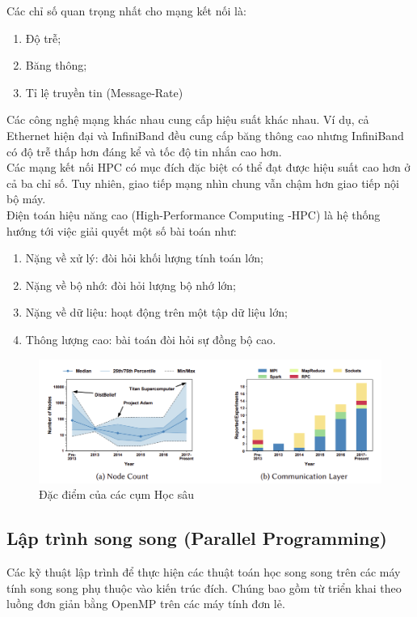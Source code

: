 \documentclass[11pt,a4paper]{article}
\numberwithin{equation}{subsection}
\numberwithin{figure}{subsection}
\numberwithin{table}{subsection}
\begin{document}
Các chỉ số quan trọng nhất cho mạng kết nối là:
\begin{enumerate}[-]
		\item Độ trễ;
		\item Băng thông;
		\item Tỉ lệ truyền tin (Message-Rate)
\end{enumerate}
Các công nghệ mạng khác nhau cung cấp hiệu suất khác nhau. Ví dụ, cả Ethernet hiện đại và InfiniBand đều cung cấp băng thông cao nhưng InfiniBand có độ trễ thấp hơn đáng kể và tốc độ tin nhắn cao hơn.\\
Các mạng kết nối HPC có mục đích đặc biệt có thể đạt được hiệu suất cao hơn ở cả ba chỉ số. Tuy nhiên, giao tiếp mạng nhìn chung vẫn chậm hơn giao tiếp nội bộ máy.\\ Điện toán hiệu năng cao (High-Performance Computing -HPC) là hệ thống hướng tới việc giải quyết một số bài toán như:
\begin{enumerate}[+]
	\item Nặng về xử lý: đòi hỏi khối lượng tính toán lớn;
	\item Nặng về bộ nhớ: đòi hỏi lượng bộ nhớ lớn;
	\item Nặng về dữ liệu: hoạt động trên một tập dữ liệu lớn;
	\item Thông lượng cao: bài toán đòi hỏi sự đồng bộ cao.
\end{enumerate}

\begin{figure}[!h]
\begin{center}
\includegraphics[scale=0.75]{parallel_Deep_2.PNG}
\end{center}
\caption{Đặc điểm của các cụm Học sâu}
\end{figure}

\subsection{Lập trình song song (Parallel Programming)}
Các kỹ thuật lập trình để thực hiện các thuật toán học song song trên các máy tính song song phụ thuộc vào kiến trúc đích. Chúng bao gồm từ triển khai theo luồng đơn giản bằng OpenMP trên các máy tính đơn lẻ.\\
\end{document}

